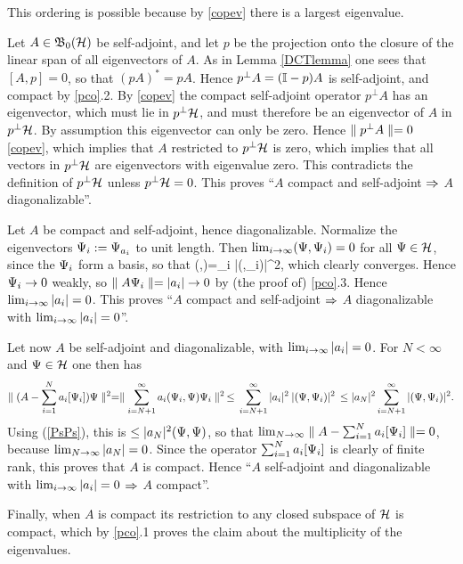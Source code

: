 This ordering is possible because by \ref{copev} there is a largest
eigenvalue.

Let $A\in{\frak B}_0({\cal H})$ be self-adjoint, and let $p$ be the projection onto the
closure of the linear span of all eigenvectors of $A$. As in Lemma
\ref{DCTlemma} one sees that $[A,p]=0$, so that $(pA)^*=pA$. Hence
$p^{\perp}A=({\Bbb I}-p)A$ is self-adjoint, and compact by \ref{pco}.2.  By
\ref{copev} the compact self-adjoint operator $p^{\perp}A$ has an
eigenvector, which must lie in $p^{\perp}{\cal H}$, and must therefore be an
eigenvector of $A$ in $p^{\perp}{\cal H}$.  By assumption this eigenvector
can only be zero. Hence $\parallel p^{\perp}A\parallel=0$ \ref{copev}, which implies
that $A$ restricted to $p^{\perp}{\cal H}$ is zero, which implies that all
vectors in $p^{\perp}{\cal H}$ are eigenvectors with eigenvalue zero. This
contradicts the definition of $p^{\perp}{\cal H}$ unless
$p^{\perp}{\cal H}=0$. This proves ``$A$ compact and self-adjoint $\Rightarrow$ $A$
diagonalizable''.

Let $A$ be compact and self-adjoint, hence diagonalizable. Normalize
the eigenvectors $\Psi_i:=\Psi_{a_i}$ to unit length. Then
$\lim_{i\rightarrow\infty} (\Psi,\Psi_i)=0$ for all $\Psi\in{\cal H}$, since the
$\Psi_i$ form a basis, so that \be (\Ps,\Ps)=\sum_i |(\Ps,\Ps_i)|^2,
 \ee which clearly converges. Hence $\Psi_i\rightarrow 0$ weakly, so
$\parallel A\Psi_i\parallel=|a_i|\rightarrow 0$ by (the proof of) \ref{pco}.3. Hence
$\lim_{i\rightarrow\infty} |a_i|=0$.  This proves ``$A$ compact and
self-adjoint $\Rightarrow$ $A$ diagonalizable with $\lim_{i\rightarrow\infty}
|a_i|=0$''.

Let now $A$ be self-adjoint and diagonalizable, with
$\lim_{i\rightarrow\infty} |a_i|=0$.  For $N<\infty$ and $\Psi\in{\cal H}$ one then
has
$$
\parallel (A-\sum_{i=1}^N a_i [\Psi_i] ) \Psi\parallel^2 =\parallel \sum_{i=N+1}^{\infty} a_i
(\Psi_i,\Psi)\Psi_i\parallel^2\, \leq\, \sum_{i=N+1}^{\infty} |a_i|^2 \:
|(\Psi,\Psi_i)|^2\,\leq |a_N|^2 \sum_{i=N+1}^{\infty}|(\Psi,\Psi_i)|^2.
$$
Using (\ref{PsPs}), this is $\leq |a_N|^2 (\Psi,\Psi)$, so that
$\lim_{N\rightarrow\infty} \parallel A-\sum_{i=1}^N a_i[\Psi_i]\parallel=0$, because
$\lim_{N\rightarrow\infty} |a_N|=0$.  Since the operator $\sum_{i=1}^N
a_i[\Psi_i]$ is clearly of finite rank, this proves that $A$ is
compact.  Hence ``$A$ self-adjoint and diagonalizable with
$\lim_{i\rightarrow\infty} |a_i|=0$ $\Rightarrow$ $A$ compact''.

Finally, when $A$ is compact its restriction to any closed subspace of
${\cal H}$ is compact, which by \ref{pco}.1 proves the claim about the
multiplicity of the eigenvalues.  \enp


